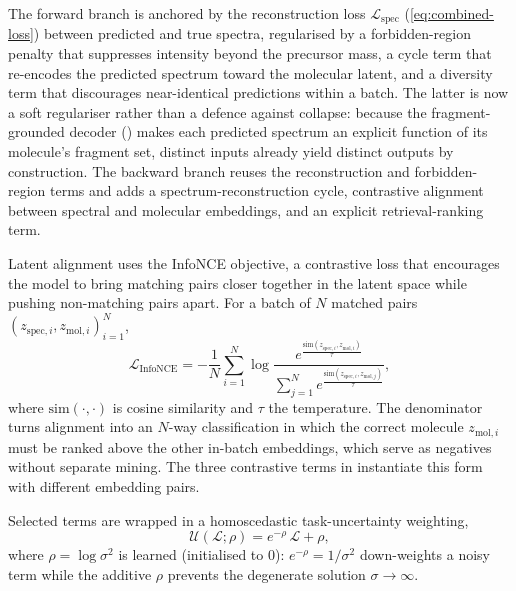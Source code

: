 The forward branch is anchored by the reconstruction loss $\mathcal{L}_{\mathrm{spec}}$ (\cref{eq:combined-loss}) between predicted and true spectra, regularised by a forbidden-region penalty that suppresses intensity beyond the precursor mass, a cycle term that re-encodes the predicted spectrum toward the molecular latent, and a diversity term that discourages near-identical predictions within a batch. The latter is now a soft regulariser rather than a defence against collapse: because the fragment-grounded decoder () makes each predicted spectrum an explicit function of its molecule's fragment set, distinct inputs already yield distinct outputs by construction. The backward branch reuses the reconstruction and forbidden-region terms and adds a spectrum-reconstruction cycle, contrastive alignment between spectral and molecular embeddings, and an explicit retrieval-ranking term.

Latent alignment uses the InfoNCE objective, a contrastive loss that encourages the model to bring matching pairs closer together in the latent space while pushing non-matching pairs apart. For a batch of $N$ matched pairs $(z_{\mathrm{spec},i}, z_{\mathrm{mol},i})_{i=1}^{N}$,
\begin{equation}
    \label{eq:infonce}
    \mathcal{L}_{\mathrm{InfoNCE}} = -\frac{1}{N}\sum_{i=1}^{N} \log \frac{e^{\frac{\mathrm{sim}(z_{\mathrm{spec},i}, z_{\mathrm{mol},i})}{\tau}}}{\sum_{j=1}^{N} e^{\frac{\mathrm{sim}(z_{\mathrm{spec},i}, z_{\mathrm{mol},j})}{\tau}}},
\end{equation}
where $\mathrm{sim}(\cdot,\cdot)$ is cosine similarity and $\tau$ the temperature.
The denominator turns alignment into an $N$-way classification in which the correct molecule $z_{\mathrm{mol},i}$ must be ranked above the other in-batch embeddings, which serve as negatives without separate mining.
The three contrastive terms in  instantiate this form with different embedding pairs.

Selected terms are wrapped in a homoscedastic task-uncertainty weighting,
\begin{equation}
    \label{eq:uncertainty-wrapper}
    \mathcal{U}(\mathcal{L};\rho) = e^{-\rho}\,\mathcal{L} + \rho,
\end{equation}
where $\rho = \log\sigma^2$ is learned (initialised to $0$): $e^{-\rho}=1/\sigma^2$ down-weights a noisy term while the additive $\rho$ prevents the degenerate solution $\sigma\!\to\!\infty$.

